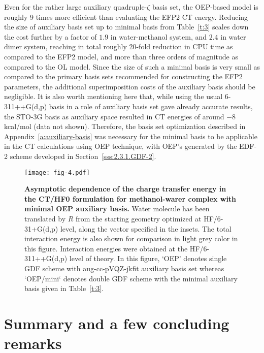 Even for the rather large auxiliary quadruple\hyp{}$\zeta$ basis set,
the OEP\hyp{}based model is roughly 9 times more efficient than evaluating the EFP2 CT energy.
Reducing the size of auxiliary basis set up to minimal basis from Table~\ref{t:3}
scales down the cost further by a factor of $1.9$ in water-methanol system,
and $2.4$ in water dimer system, reaching in total roughly 20\hyp{}fold
reduction in CPU time as compared to the EFP2 model, and more than three orders of magnitude
as compared to the OL model. Since the size of such a minimal basis
is very small as compared to the primary basis sets recommended for constructing
the EFP2 parameters, the additional superimposition costs of the auxiliary basis
should be negligible.
It is also worth mentioning here that, while using the usual 6-311++G(d,p) basis
in a role of auxiliary basis set 
gave already accurate results, the STO-3G basis as auxiliary space resulted
in CT energies of around $-8$ kcal/mol (data not shown). Therefore, the basis set optimization
described in Appendix~\ref{a:auxiliary-basis} was necessary for the minimal basis to be applicable
in the CT calculations using OEP technique, with OEP's generated by the EDF-2 scheme
developed in Section~\ref{sss:2.3.1.GDF-2}. 
%
%
\begin{figure}[t]
\texttt{[image: fig-4.pdf]}
\caption{\label{f:fig-4} {\bf Asymptotic dependence of the charge transfer energy
in the CT/HF0 formulation for methanol-warer complex with minimal OEP auxiliary basis.} 
Water molecule has been translated by $R$ from the starting geometry
optimized at HF/6-31+G(d,p) level,
along the vector specified in the insets.
The total interaction energy
is also shown for comparison in light grey color in this figure.
Interaction energies were obtained at the HF/6-311++G(d,p) level of theory.
In this figure, `OEP' denotes single GDF scheme with aug-cc-pVQZ-jkfit auxiliary basis set
whereas `OEP/mini` denotes double GDF scheme with the minimal auxiliary basis
given in Table~\ref{t:3}.
} 
\end{figure}
%



\section{\label{s:6.conclusions}Summary and a few concluding remarks}

